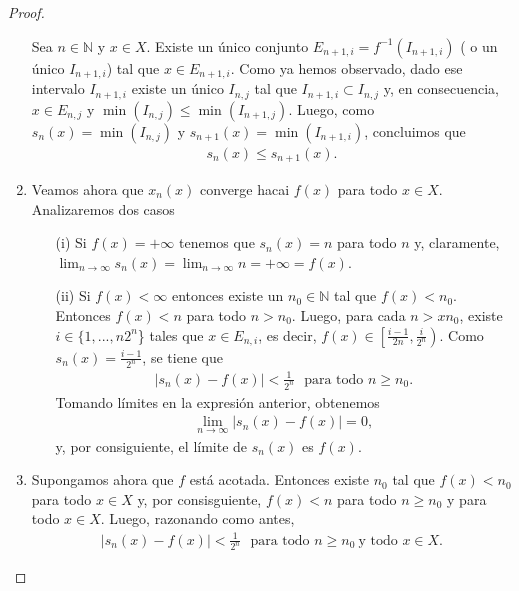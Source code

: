 \begin{proof}
\begin{enumerate}
              Sea $n \in \mathbb{N}$ y $x \in X$. Existe un único conjunto $E_{n+1,i} = f^{-1}(I_{n+1,i})$ ( o un único $I_{n+1,i}$) tal que $x \in E_{n+1,i}$. Como ya hemos observado, dado ese intervalo $I_{n+1,i}$ existe un único $I_{n,j}$ tal que $I_{n+1,i} \subset I_{n,j}$ y, en consecuencia, $x \in E_{n,j}$ y $\min(I_{n,j}) \leq \min(I_{n+1,j})$. Luego, como $s_n(x) = \min(I_{n,j})$ y $s_{n+1}(x) = \min(I_{n+1,i})$, concluimos que
              \begin{align*}
                  s_n(x) \leq s_{n+1}(x).
              \end{align*}
        \item Veamos ahora que $x_n(x)$ converge hacai $f(x)$ para todo $x \in X$. Analizaremos dos casos
              \begin{enumerate}
                  \item[(i)] Si $f(x) = +\infty$ tenemos que $s_n(x) = n$ para todo $n$ y, claramente, $\lim_{n \to \infty}{s_n(x)} = \lim_{n \to \infty}{n} = +\infty =  f(x)$.
                  \item[(ii)] Si $f(x) < \infty$ entonces existe un $n_0 \in \mathbb{N}$ tal que $f(x) < n_0$. Entonces $f(x) < n$ para todo $n > n_0$. Luego, para cada $n >x n_0$, existe $i \in \{ 1,...,n2^n$\} tales que $x \in E_{n,i}$, es decir, $f(x) \in \left[ \frac{i-1}{2n}, \frac{i}{2^n} \right)$. Como $s_n(x) = \frac{i-1}{2^n}$, se tiene que
                        \begin{align*}
                            |s_n(x) - f(x)| < \frac{1}{2^n} \ \ \ \text{para todo } n \ge n_0.
                        \end{align*}
                        Tomando límites en la expresión anterior, obtenemos
                        \begin{align*}
                            \lim_{n \to \infty}{|s_n(x) - f(x)|} = 0,
                        \end{align*}
                        y, por consiguiente, el límite de $s_n(x)$ es $f(x)$.
              \end{enumerate}
        \item Supongamos ahora que $f$ está acotada. Entonces existe $n_0$ tal que $f(x) < n_0$ para todo $x \in X$ y, por consisguiente, $f(x) < n$ para todo $n \ge n_0$ y para todo $x \in X$. Luego, razonando como antes,
              \begin{align*}
                  |s_n(x) - f(x)| < \frac{1}{2^n} \ \ \ \text{para todo } n \ge n_0 \ \text{y todo } x \in X.
              \end{align*}

\end{enumerate}
\end{proof}
